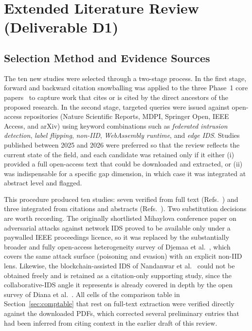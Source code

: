 \documentclass[11pt,a4paper]{article}
\newcommand{\bigsection}[1]{\Needspace*{0.22\textheight}\section{#1}}
\begin{document}
\bigsection{Extended Literature Review (Deliverable D1)}\label{sec:litreview}

\subsection{Selection Method and Evidence Sources}\label{sec:selection}

The ten new studies were selected through a two-stage process. In the first
stage, forward and backward citation snowballing was applied to the three
Phase~1 core papers~\cite{flexids,mahida2026,weber2026} to capture work that
cites or is cited by the direct ancestors of the proposed research. In the
second stage, targeted queries were issued against open-access repositories
(Nature Scientific Reports, MDPI, Springer Open, IEEE Access, and arXiv)
using keyword combinations such as \emph{federated intrusion detection},
\emph{label flipping}, \emph{non-IID}, \emph{WebAssembly runtime}, and
\emph{edge IDS}. Studies published between 2025 and 2026 were preferred so
that the review reflects the current state of the field, and each candidate
was retained only if it either (i) provided a full open-access text that
could be downloaded and extracted, or (ii) was indispensable for a specific
gap dimension, in which case it was integrated at abstract level and
flagged.

This procedure produced ten studies: seven verified from full text
(Refs.~\cite{albogami2025,karunamurthy2025,berguiga2025,zhang2025,djemaa2026,hozouri2025,diana2025})
and three integrated from citations and abstracts
(Refs.~\cite{rezaei2025,bensaid2025,nandanwar2025}). Two substitution
decisions are worth recording. The originally shortlisted Mihaylova
conference paper on adversarial attacks against network IDS proved to be
available only under a paywalled IEEE proceedings licence, so it was
replaced by the substantially broader and fully open-access heterogeneity
survey of Djemaa et al.~\cite{djemaa2026}, which covers the same attack
surface (poisoning and evasion) with an explicit non-IID lens. Likewise,
the blockchain-assisted IDS of Nandanwar et al.~\cite{nandanwar2025} could
not be obtained freely and is retained as a citation-only supporting study,
since the collaborative-IDS angle it represents is already covered in depth
by the open survey of Diana et al.~\cite{diana2025}. All cells of the
comparison table in Section~\ref{sec:comptable} that rest on full-text
extraction were verified directly against the downloaded PDFs, which
corrected several preliminary entries that had been inferred from citing
context in the earlier draft of this review.
\end{document}
